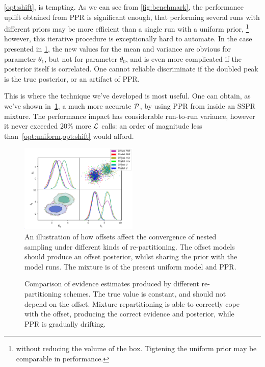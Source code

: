 \documentclass[usenatbib]{mnras}
\begin{document}
\vref{opt:shift}, is tempting. As we can see from
\cref{fig:benchmark}, the performance uplift obtained from PPR is
significant enough, that performing several runs with different
priors may be more efficient than a single run with a uniform prior,
\footnote{without reducing the volume of the box. Tigtening the uniform
prior may be comparable in performance.} however, this iterative
procedure is exceptionally hard to automate. In the case presented
in \cref{fig:convergence}, the new values for the mean and variance
are obvious for parameter $\theta_{1}$, but not for parameter $\theta_{0}$, and is
even more complicated if the posterior itself is correlated. One
cannot reliable discriminate if the doubled peak is the true
posterior, or an artifact of PPR.

This is where the technique we've developed is most useful. One can
obtain, as we've shown in~\cref{fig:convergence}, a much more
accurate \({\cal P}\), by using PPR from inside an SSPR mixture. The
performance impact has considerable run-to-run variance, however it
never exceeded \(20\%\) more \({\cal L}\) calls: an order of
magnitude less than~\vref{opt:uniform,opt:shift} would afford.

\begin{figure}
\includegraphics[width=0.5\textwidth]{./illustrations/convergence.pdf}
\caption{An illustration of how offsets affect the convergence of nested sampling under different kinds of re-partitioning. The offset models should produce an offset posterior, whilst sharing the prior with the model runs. The mixture is of the present uniform model and PPR.\label{fig:convergence}}
\end{figure}

\begin{figure}
  
\caption{Comparison of evidence estimates produced by different re-partitioning schemes. The true value is constant, and should not depend on the offset. Mixture repartitioning is able to correctly cope with the offset, producing the correct evidence and posterior, while PPR is gradually drifting.\label{fig:drift}}
\end{figure}
\end{document}
